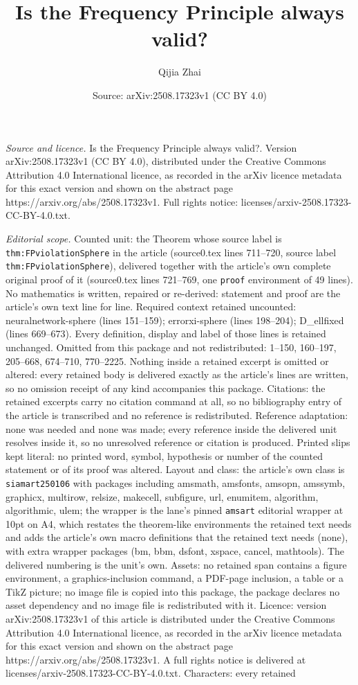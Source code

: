 \documentclass[10pt,a4paper]{amsart}
\title[Is the Frequency Principle always valid?]{Is the Frequency Principle always valid?}
\author{Qijia Zhai}
\date{Source: arXiv:2508.17323v1 (CC BY 4.0)}
\begin{document}
\maketitle

\noindent\emph{Source and licence.} Is the Frequency Principle always valid?. Version arXiv:2508.17323v1 (CC BY 4.0), distributed under the Creative Commons Attribution 4.0 International licence, as recorded in the arXiv licence metadata for this exact version and shown on the abstract page https://arxiv.org/abs/2508.17323v1. Full rights notice: licenses/arxiv-2508.17323-CC-BY-4.0.txt.\par\smallskip

\noindent\textit{Editorial scope.} Counted unit: the Theorem whose source label is \texttt{thm:FPviolationSphere} in the article (source0.tex lines 711--720, source label \texttt{thm:FPviolationSphere}), delivered together with the article's own complete original proof of it (source0.tex lines 721--769, one \texttt{proof} environment of 49 lines). No mathematics is written, repaired or re-derived: statement and proof are the article's own text line for line. Required context retained uncounted: neuralnetwork-sphere (lines 151--159); errorxi-sphere (lines 198--204); D\_ellfixed (lines 669--673). Every definition, display and label of those lines is retained unchanged. Omitted from this package and not redistributed: 1--150, 160--197, 205--668, 674--710, 770--2225. Nothing inside a retained excerpt is omitted or altered: every retained body is delivered exactly as the article's lines are written, so no omission receipt of any kind accompanies this package. Citations: the retained excerpts carry no citation command at all, so no bibliography entry of the article is transcribed and no reference is redistributed. Reference adaptation: none was needed and none was made; every reference inside the delivered unit resolves inside it, so no unresolved reference or citation is produced. Printed slips kept literal: no printed word, symbol, hypothesis or number of the counted statement or of its proof was altered. Layout and class: the article's own class is \texttt{siamart250106} with packages including amsmath, amsfonts, amsopn, amssymb, graphicx, multirow, relsize, makecell, subfigure, url, enumitem, algorithm, algorithmic, ulem; the wrapper is the lane's pinned \texttt{amsart} editorial wrapper at 10pt on A4, which restates the theorem-like environments the retained text needs and adds the article's own macro definitions that the retained text needs (none), with extra wrapper packages (bm, bbm, dsfont, xspace, cancel, mathtools). The delivered numbering is the unit's own. Assets: no retained span contains a figure environment, a graphics-inclusion command, a PDF-page inclusion, a table or a TikZ picture; no image file is copied into this package, the package declares no asset dependency and no image file is redistributed with it. Licence: version arXiv:2508.17323v1 of this article is distributed under the Creative Commons Attribution 4.0 International licence, as recorded in the arXiv licence metadata for this exact version and shown on the abstract page https://arxiv.org/abs/2508.17323v1. A full rights notice is delivered at licenses/arxiv-2508.17323-CC-BY-4.0.txt. Characters: every retained 
\end{document}
